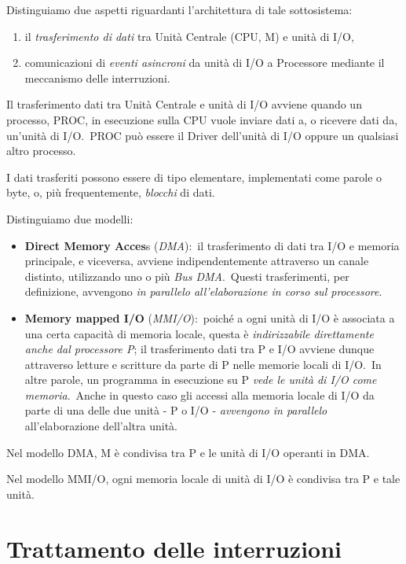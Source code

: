 Distinguiamo due aspetti riguardanti l'architettura di tale sottosistema:
\begin{enumerate}
    \item il \textit{trasferimento di dati} tra Unità Centrale (CPU, M) e unità di I/O,
    \item comunicazioni di \textit{eventi asincroni} da unità di I/O a Processore mediante il meccanismo delle  interruzioni.
\end{enumerate}

\noindent Il trasferimento dati tra Unità Centrale e unità di I/O avviene quando un processo, PROC, in esecuzione sulla CPU vuole inviare dati a, o ricevere dati da, un'unità di I/O.\
PROC può essere il Driver dell'unità di I/O oppure un qualsiasi altro processo.

I dati trasferiti possono essere di tipo elementare, implementati come parole o byte, o, più frequentemente, \textit{blocchi} di dati.

Distinguiamo due modelli:
\begin{itemize}
    \item \textbf{Direct Memory Acces}s (\textit{DMA}):\ il trasferimento di dati tra I/O e memoria principale, e viceversa, avviene indipendentemente attraverso un canale distinto, utilizzando uno o più \textit{Bus DMA}.\ Questi trasferimenti, per definizione, avvengono \textit{in parallelo all'elaborazione in corso sul processore}.
    \item \textbf{Memory mapped I/O} (\textit{MMI/O}):\ poiché a ogni unità di I/O è associata a una certa capacità di memoria locale, questa è \textit{indirizzabile direttamente anche dal processore P}; il trasferimento dati tra P e I/O avviene dunque attraverso letture e scritture da parte di P nelle memorie locali di I/O.\ In altre parole, un programma in esecuzione su P \textit{vede le unità di I/O come memoria}.\ Anche in questo caso gli accessi alla memoria locale di I/O da parte di una delle due unità - P o I/O - \textit{avvengono in parallelo} all'elaborazione dell'altra unità.
\end{itemize}

\noindent Nel modello DMA, M è condivisa tra P e le unità di I/O operanti in DMA.

Nel modello MMI/O, ogni memoria locale di unità di I/O è condivisa tra P e tale unità.

\section{Trattamento delle interruzioni}

